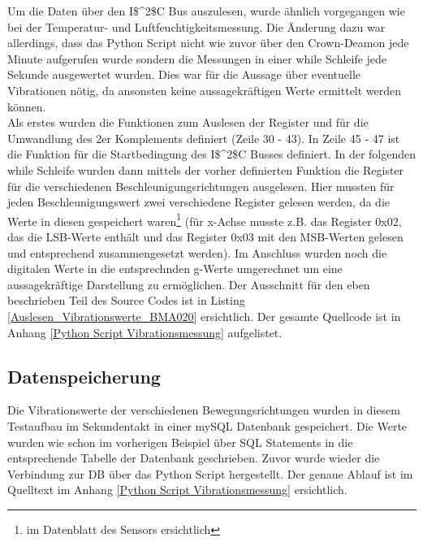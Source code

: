 Um die Daten über den \ac{I$^2$C} Bus auszulesen, wurde ähnlich vorgegangen wie bei der Temperatur- und Luftfeuchtigkeitsmessung. Die Änderung dazu war allerdings, dass das Python Script nicht wie zuvor über den Crown-Deamon jede Minute aufgerufen wurde sondern die Messungen in einer while Schleife jede Sekunde ausgewertet wurden. Dies war für die Aussage über eventuelle Vibrationen nötig, da ansonsten keine aussagekräftigen Werte ermittelt werden können.\\
Als erstes wurden die Funktionen zum Auslesen der Register und für die Umwandlung des 2er Komplements definiert (Zeile 30 - 43). In Zeile 45 - 47 ist die Funktion für die Startbedingung des \ac{I$^2$C} Busses definiert. In der folgenden while Schleife wurden dann mittels der vorher definierten Funktion die Register für die verschiedenen Beschleunigungsrichtungen ausgelesen. Hier mussten für jeden Beschleunigungswert zwei verschiedene Register gelesen werden, da die Werte in diesen gespeichert waren\footnote{im Datenblatt des Sensors ersichtlich} (für x-Achse musste z.B. das Register 0x02, das die LSB-Werte enthält und das Register 0x03 mit den MSB-Werten gelesen und entsprechend zusammengesetzt werden). Im Anschluss wurden noch die digitalen Werte in die entsprechnden g-Werte umgerechnet um eine aussagekräftige Darstellung zu ermöglichen. Der Ausschnitt für den eben beschrieben Teil des Source Codes ist in Listing \ref{Auslesen_Vibrationswerte_BMA020} ersichtlich. Der gesamte Quellcode ist in Anhang \ref{Python Script Vibrationsmessung} aufgelistet.



\subsection{Datenspeicherung}
\label{subsection_Speicherung_der_Vibrationsdaten}
Die Vibrationswerte der verschiedenen Bewegungsrichtungen wurden in diesem Testaufbau im Sekundentakt in einer mySQL Datenbank gespeichert. Die Werte wurden wie schon im vorherigen Beispiel über SQL Statements in die entsprechende Tabelle der Datenbank geschrieben. Zuvor wurde wieder die Verbindung zur DB über das Python Script hergestellt. Der genaue Ablauf ist im Quelltext im Anhang \ref{Python Script Vibrationsmessung} ersichtlich.

